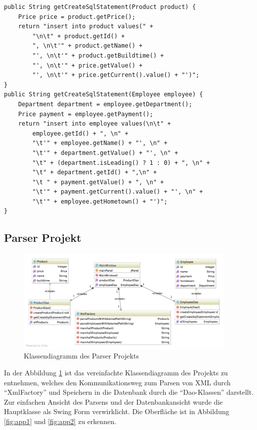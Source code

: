 \documentclass[DIV=calc,paper=a4,fontsize=9pt,twocolumn]{scrartcl}
\begin{document}
\lstset{language=Java}
\begin{lstlisting}
public String getCreateSqlStatement(Product product) {
    Price price = product.getPrice();
    return "insert into product values(" +
        "\n\t" + product.getId() +
        ", \n\t'" + product.getName() +
        "', \n\t'" + product.getBuildtime() +
        "', \n\t'" + price.getValue() +
        "', \n\t'" + price.getCurrent().value() + "')";
}
public String getCreateSqlStatement(Employee employee) {
    Department department = employee.getDepartment();
    Price payment = employee.getPayment();
    return "insert into employee values(\n\t" +
        employee.getId() + ", \n" +
        "\t'" + employee.getName() + "', \n" +
        "\t'" + department.getValue() + "', \n" +
        "\t" + (department.isLeading() ? 1 : 0) + ", \n" +
        "\t" + department.getId() + ",\n" +
        "\t " + payment.getValue() + ", \n" +
        "\t'" + payment.getCurrent().value() + "', \n" +
        "\t'" + employee.getHometown() + "')";
}
\end{lstlisting}

\subsection{Parser Projekt}

\begin{figure}[ht]
    \includegraphics[width=0.95\textwidth ]{class.png}{}
    \centering
    \caption{Klassendiagramm des Parser Projekts}\label{fig:class}
\end{figure}

In der Abbildung \ref{fig:class} ist das vereinfachte Klassendiagramm des Projekts zu entnehmen, welches den Kommunikationsweg zum Parsen von XML durch \enquote{XmlFactory} und Speichern in die Datenbank durch die \enquote{Dao-Klassen} darstellt. Zur einfachen Ansicht des Parsens und der Datenbankansicht wurde die Hauptklasse als Swing Form verwirklicht. Die Oberfläche ist in Abbildung \ref{fig:app1} und \ref{fig:app2} zu erkennen. 
\end{document}
